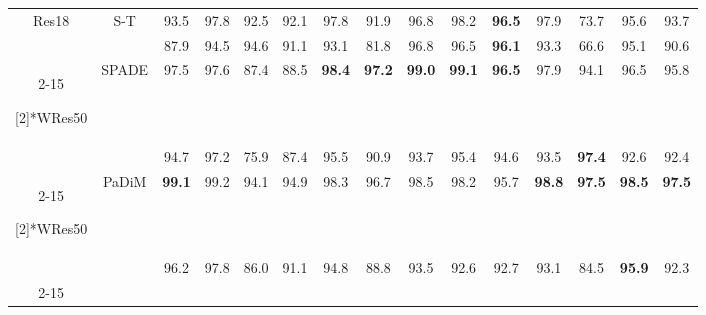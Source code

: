 \begin{table*}[htbp]
{\begin{tabular}{ccccccccccccccc}
\multirow{2}[2]{*}{Res18} & \multirow{2}[2]{*}{S-T\cite{S-T}} & 
\cellcolor{green!5} 93.5  & \cellcolor{green!5} 97.8  & \cellcolor{green!5} 92.5  & \cellcolor{green!5} 92.1  & \cellcolor{green!5} 97.8  & \cellcolor{green!5} 91.9  & \cellcolor{green!5} 96.8  & \cellcolor{green!5} 98.2  & \cellcolor{green!5} \textbf{96.5}  & \cellcolor{green!5} 97.9  & \cellcolor{green!5} 73.7  & \cellcolor{green!5} 95.6  & \cellcolor{green!5} 93.7 \\
& \multicolumn{1}{c}{} & 
\cellcolor{blue!5}  87.9  & \cellcolor{blue!5} 94.5  & \cellcolor{blue!5} 94.6  & \cellcolor{blue!5} 91.1  & \cellcolor{blue!5} 93.1  & \cellcolor{blue!5} 81.8  & \cellcolor{blue!5} 96.8  & \cellcolor{blue!5} 96.5  & \cellcolor{blue!5} \textbf{96.1}  & \cellcolor{blue!5} 93.3  & \cellcolor{blue!5} 66.6  & \cellcolor{blue!5} 95.1  & \cellcolor{blue!5} 90.6 \\
\cmidrule{2-15}      

\multirow{2}[2]{*}{WRes50}    & \multirow{2}[2]{*}{SPADE\cite{SPADE}} & 
\cellcolor{green!5} 97.5  & \cellcolor{green!5} 97.6  & \cellcolor{green!5} 87.4  & \cellcolor{green!5} 88.5  & \cellcolor{green!5} \textbf{98.4} & \cellcolor{green!5} \textbf{97.2} & \cellcolor{green!5} \textbf{99.0} & \cellcolor{green!5} \textbf{99.1} & \cellcolor{green!5} \textbf{96.5} & \cellcolor{green!5} 97.9  & \cellcolor{green!5} 94.1  & \cellcolor{green!5} 96.5  & \cellcolor{green!5} 95.8 \\
& \multicolumn{1}{c}{} & 
\cellcolor{blue!5} 94.7  & \cellcolor{blue!5} 97.2  & \cellcolor{blue!5} 75.9  & \cellcolor{blue!5} 87.4  & \cellcolor{blue!5} 95.5  & \cellcolor{blue!5} 90.9 & \cellcolor{blue!5} 93.7  & \cellcolor{blue!5} 95.4  & \cellcolor{blue!5} 94.6  & \cellcolor{blue!5} 93.5  & \cellcolor{blue!5} \textbf{97.4} & \cellcolor{blue!5} 92.6  & \cellcolor{blue!5} 92.4 \\
\cmidrule{2-15}     

\multirow{2}[2]{*}{WRes50}    & \multirow{2}[2]{*}{PaDiM\cite{PaDiM}} & 
\cellcolor{green!5} \textbf{99.1} & \cellcolor{green!5} 99.2  & \cellcolor{green!5} 94.1  & \cellcolor{green!5} 94.9  & \cellcolor{green!5} 98.3  & \cellcolor{green!5} 96.7  & \cellcolor{green!5} 98.5  & \cellcolor{green!5} 98.2  & \cellcolor{green!5} 95.7  & \cellcolor{green!5} \textbf{98.8}  & \cellcolor{green!5} \textbf{97.5} & \cellcolor{green!5} \textbf{98.5} & \cellcolor{green!5} \textbf{97.5} \\
& \multicolumn{1}{c}{} & 
\cellcolor{blue!5} 96.2  & \cellcolor{blue!5} 97.8  & \cellcolor{blue!5} 86.0    & \cellcolor{blue!5} 91.1  & \cellcolor{blue!5} 94.8  & \cellcolor{blue!5} 88.8  & \cellcolor{blue!5} 93.5  & \cellcolor{blue!5} 92.6  & \cellcolor{blue!5} 92.7  & \cellcolor{blue!5} 93.1  & \cellcolor{blue!5} 84.5  & \cellcolor{blue!5} \textbf{95.9} & 92.3 \\
\cmidrule{2-15}     


\end{tabular}}
\end{table*}
